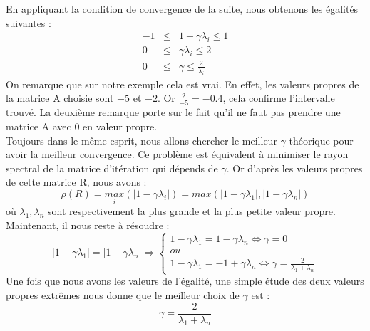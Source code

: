 En appliquant la condition de convergence de la suite, nous obtenons les égalités suivantes : 
\begin{eqnarray}
-1 &\leq& 1 - \gamma \lambda_i \leq 1\\
0 &\leq& \gamma \lambda_i \leq 2\\
0 &\leq& \gamma \leq \frac{2}{\lambda_i}
\end{eqnarray}
On remarque que sur notre exemple cela est vrai. En effet, les valeurs propres de la matrice A choisie sont $-5$ et $-2$. Or $\frac{2}{-5} = -0.4$, cela confirme l'intervalle trouvé. La deuxième remarque porte sur le fait qu'il ne faut pas prendre une matrice A avec 0 en valeur propre.\\

Toujours dans le même esprit, nous allons chercher le meilleur $\gamma$ théorique pour avoir la meilleur convergence. Ce problème est équivalent à minimiser le rayon spectral de la matrice d'itération qui dépends de $\gamma$. Or d'après les valeurs propres de cette matrice R, nous avons : 
\begin{equation}
	\rho(R) = \underset{i}{max}(|1 - \gamma\lambda_i|) = max(|1 - \gamma\lambda_1|, |1 - \gamma\lambda_n|)
\end{equation}
où $\lambda_1, \lambda_n$ sont respectivement la plus grande et la plus petite valeur propre. Maintenant, il nous reste à résoudre : 
\begin{equation}
|1 - \gamma\lambda_1| =  |1 - \gamma\lambda_n| \Rightarrow 
\begin{cases}
1 - \gamma\lambda_1 = 1 - \gamma\lambda_n \Leftrightarrow \gamma = 0\\
ou\\
1 - \gamma\lambda_1 = - 1 + \gamma\lambda_n \Leftrightarrow \gamma = \frac{2}{\lambda_1 + \lambda_n}
\end{cases}
\end{equation}
Une fois que nous avons les valeurs de l'égalité, une simple étude des deux valeurs propres extrêmes nous donne que le meilleur choix de $\gamma$ est : 
\begin{equation}
\gamma = \frac{2}{\lambda_1 + \lambda_n}
\end{equation}
